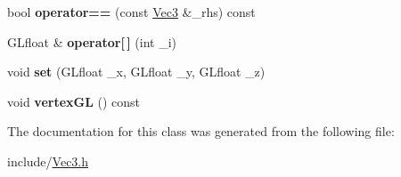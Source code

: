 \begin{DoxyCompactItemize}
\item 
\hypertarget{classVec3_a9b41ea429d7d6407df1edd5aac5fa0e6}{bool {\bfseries operator==} (const \hyperlink{classVec3}{Vec3} \&\-\_\-rhs) const }\label{classVec3_a9b41ea429d7d6407df1edd5aac5fa0e6}

\item 
\hypertarget{classVec3_a9cab569511fddfcf377dc21ffdae4693}{G\-Lfloat \& {\bfseries operator\mbox{[}$\,$\mbox{]}} (int \-\_\-i)}\label{classVec3_a9cab569511fddfcf377dc21ffdae4693}

\item 
\hypertarget{classVec3_ac1b15d91c3a8735d411d54eb7baba015}{void {\bfseries set} (G\-Lfloat \-\_\-x, G\-Lfloat \-\_\-y, G\-Lfloat \-\_\-z)}\label{classVec3_ac1b15d91c3a8735d411d54eb7baba015}

\item 
\hypertarget{classVec3_a3f151676ea36dc9e6047489dd76de2be}{void {\bfseries vertex\-G\-L} () const }\label{classVec3_a3f151676ea36dc9e6047489dd76de2be}

\end{DoxyCompactItemize}


The documentation for this class was generated from the following file\-:\begin{DoxyCompactItemize}
\item 
include/\hyperlink{Vec3_8h}{Vec3.\-h}\end{DoxyCompactItemize}
